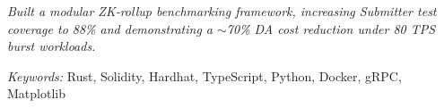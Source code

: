  
\noindent 
\textit{Built a modular ZK-rollup benchmarking framework, increasing Submitter test coverage to 88\% and demonstrating a $\sim$70\% DA cost reduction under 80 TPS burst workloads.} 
 
\noindent 
\textit{Keywords:} Rust, Solidity, Hardhat, TypeScript, Python, Docker, gRPC, Matplotlib
